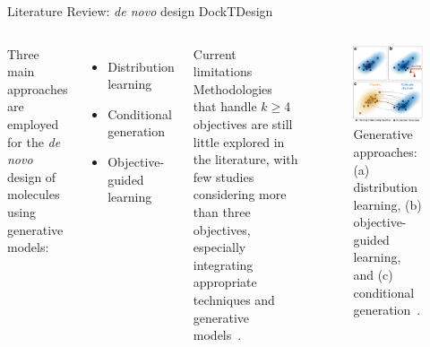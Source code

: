 \documentclass[aspectratio=169,xcolor=dvipsnames]{beamer}
\begin{document}
\begin{frame}{Literature Review: \textit{de novo} design \hfill {\footnotesize \alert{DockTDesign}}}
    \begin{columns}[c]
        Three main approaches are employed for the \textit{de novo} design of molecules using generative models:
        \begin{itemize}
            \item Distribution learning
            \item Conditional generation
            \item Objective-guided learning
        \end{itemize}
        \begin{block}{Current limitations}
            Methodologies that handle $k\geq$4 objectives are still little
            explored in the literature, with few studies considering
            more than three objectives, especially integrating appropriate techniques and generative models~\cite{angelo2023multi}.
        \end{block}

        \begin{figure}
            \centering
            \includegraphics[width=.75\linewidth]{imgs/generation-approaches.png}
            \caption{Generative approaches: (a) distribution learning, (b) objective-guided learning, and (c) conditional generation~\cite{özçelik2025generative}.}
        \end{figure}
    \end{columns}
\end{frame}
\end{document}

